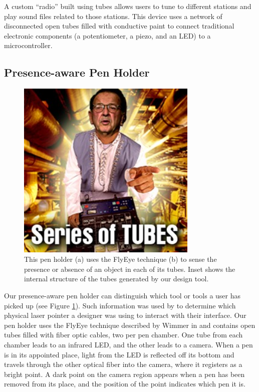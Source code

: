 A custom ``radio'' built using tubes allows users to tune to different stations and play sound files related to those stations.  This device uses a network of disconnected open tubes filled with conductive paint to connect traditional electronic components (a potentiometer, a piezo, and an LED) to a microcontroller.

\subsection{Presence-aware Pen Holder}

\begin{figure}[h]
\centering
    \includegraphics[width=3.4in]{figures/series-of-tubes.jpg}
\caption{This pen holder (a) uses the FlyEye technique (b) to sense the presence or absence of an object in each of its tubes.  Inset shows the internal structure of the tubes generated by our design tool.}
\label{fig:pens}
\end{figure}

Our presence-aware pen holder can distinguish which tool or tools a user has picked up (see Figure \ref{fig:pens}).  Such information was used by \cite{Mueller-constructable} to determine which physical laser pointer a designer was using to interact with their interface.  Our pen holder uses the FlyEye technique described by Wimmer in \cite{Wimmer-flyeye} and contains open tubes filled with fiber optic cables, two per pen chamber.  One tube from each chamber leads to an infrared LED, and the other leads to a camera.  When a pen is in its appointed place, light from the LED is reflected off its bottom and travels through the other optical fiber into the camera, where it registers as a bright point.  A dark point on the camera region appears when a pen has been removed from its place, and the position of the point indicates which pen it is.

